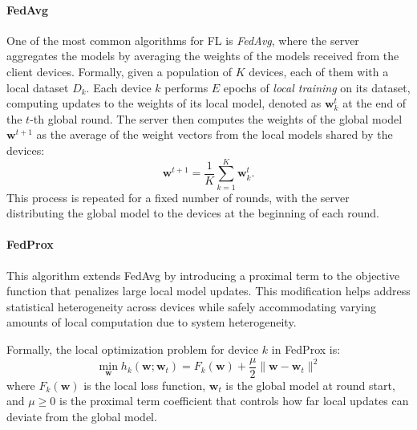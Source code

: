 \paragraph{FedAvg}
One of the most common algorithms for FL is \emph{FedAvg}, 
 where the server aggregates the models by averaging the weights of the models received from the client devices.
%
Formally, given a population of $K$ devices, each of them with a local dataset $D_k$.
Each device $k$ performs $E$ epochs of \emph{local training} on its dataset, 
 computing updates to the weights of its local model, denoted as $\mathbf{w}_k^t$ at 
 the end of the $t$-th global round.
%
The server then computes the weights of the global model $\mathbf{w}^{t+1}$ as the average of the weight 
 vectors from the local models shared by the devices:
\begin{equation}
  \mathbf{w}^{t+1} = \frac{1}{K} \sum_{k=1}^K \mathbf{w}_k^t.
\end{equation}\label{eq:fedavg}
%
This process is repeated for a fixed number of rounds, 
 with the server distributing the global model to the devices at the beginning of each round.

\paragraph{FedProx}
This algorithm extends FedAvg by introducing a proximal term to the objective 
 function that penalizes large local model updates.
%
This modification helps address statistical heterogeneity across devices while safely 
 accommodating varying amounts of local computation due to system heterogeneity.

Formally, the local optimization problem for device $k$ in FedProx is:
\begin{equation} 
  \min_{\mathbf{w}} h_k(\mathbf{w}; \mathbf{w}_t) = F_k(\mathbf{w}) + \frac{\mu}{2} \|\mathbf{w} - \mathbf{w}_t\|^2 
\end{equation}
where $F_k(\mathbf{w})$ is the local loss function, $\mathbf{w}_t$ is the global model at round start, 
 and $\mu \geq 0$ is the proximal term coefficient that controls how far local 
 updates can deviate from the global model.

